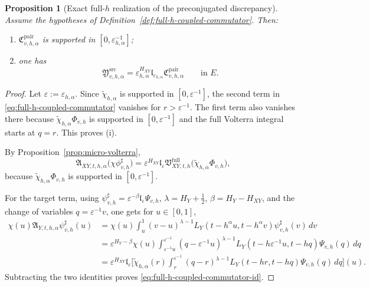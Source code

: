 \documentclass[11pt,a4paper]{amsart}
\theoremstyle{plain}
\newtheorem{proposition}[theorem]{Proposition}
\theoremstyle{definition}
\theoremstyle{remark}
\begin{document}
\begin{proposition}[Exact full-\(h\) realization of the preconjugated discrepancy]
\label{prop:full-h-coupled-commutator}
Assume the hypotheses of Definition~\ref{def:full-h-coupled-commutator}. Then:
\begin{enumerate}[label=(\roman*)]
\item \(\mathfrak C_{v,h,\alpha}^{\mathrm{pair}}\) is supported in
\([0,\varepsilon_{h,\alpha}^{-1}]\);
\item one has
\begin{equation}\label{eq:full-h-coupled-commutator-id}
\mathfrak Y_{v,h,\alpha}^{\mathrm{src}}
=
\varepsilon_{h,\alpha}^{H_{XY}}
\mathfrak l_{\varepsilon_{h,\alpha}}
\mathfrak C_{v,h,\alpha}^{\mathrm{pair}}
\qquad\text{in }E.
\end{equation}
\end{enumerate}
\end{proposition}

\begin{proof}
  Let \(\varepsilon:=\varepsilon_{h,\alpha}\). Since \(\widetilde\chi_{h,\alpha}\) is supported in
  \([0,\varepsilon^{-1}]\), the second term in \eqref{eq:full-h-coupled-commutator} vanishes for
  \(r>\varepsilon^{-1}\). The first term also vanishes there because
  \(\widetilde\chi_{h,\alpha}\Phi_{v,h}\) is supported in \([0,\varepsilon^{-1}]\) and the full
  Volterra integral starts at \(q=r\). This proves (i).

  By Proposition~\ref{prop:micro-volterra},
  \[
  \mathfrak A_{XY,t,h,\alpha}
  \bigl(
  \chi\phi_{v,h}^{\sharp}
  \bigr)
  =
  \varepsilon^{H_{XY}}
  \mathfrak l_{\varepsilon}
  \mathfrak V_{XY,t,h}^{\mathrm{full}}
  \bigl(
  \widetilde\chi_{h,\alpha}\Phi_{v,h}
  \bigr),
  \]
  because \(\widetilde\chi_{h,\alpha}\Phi_{v,h}\) is supported in \([0,\varepsilon^{-1}]\).

  For the target term, using \(\psi_{v,h}^{\sharp}=\varepsilon^{-\beta}\mathfrak l_{\varepsilon}\Psi_{v,h}\),
  \(\lambda=H_Y+\tfrac12\), \(\beta=H_Y-H_{XY}\), and the change of variables \(q=\varepsilon^{-1}v\),
  one gets for \(u\in[0,1]\),
  \begin{align*}
  \chi(u)\mathfrak A_{Y,t,h,\alpha}\psi_{v,h}^{\sharp}(u)
  &=
  \chi(u)
  \int_u^1
  (v-u)^{\lambda-1}
  L_Y(t-h^\alpha u,t-h^\alpha v)\psi_{v,h}^{\sharp}(v)\,dv\\
  &=
  \varepsilon^{H_Y-\beta}
  \chi(u)
  \int_{\varepsilon^{-1}u}^{\varepsilon^{-1}}
  (q-\varepsilon^{-1}u)^{\lambda-1}
  L_Y(t-h\varepsilon^{-1}u,t-hq)\Psi_{v,h}(q)\,dq\\
  &=
  \varepsilon^{H_{XY}}
  \mathfrak l_{\varepsilon}
  \Biggl[
  \widetilde\chi_{h,\alpha}(r)
  \int_r^{\varepsilon^{-1}}
  (q-r)^{\lambda-1}
  L_Y(t-hr,t-hq)\Psi_{v,h}(q)\,dq
  \Biggr](u).
  \end{align*}
    Subtracting the two identities proves \eqref{eq:full-h-coupled-commutator-id}.
  \end{proof}
\end{document}
